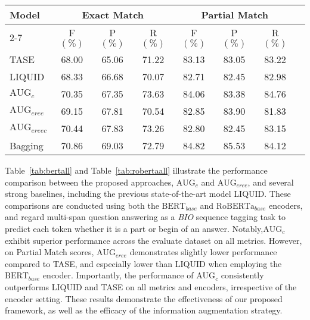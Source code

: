 \begin{table*}[width=\textwidth,cols=8,pos=h]  
	\caption{Approach performance on complete MultiSpanQA valid set based on $\text{RoBERTa}_{base}$.} 
	\label{tab:robertaall}
	\begin{tabular*}{\textwidth}{@{\extracolsep{\fill}}lccccccc}
		\toprule
		\multirow{2}{*}{\textbf{Model}} & \multicolumn{3}{c}{Exact Match} & \multicolumn{3}{c}{Partial Match}  \\
		\cline{2-7} 
		\addlinespace
		& F\((\%)\) & P\((\%)\) & R\((\%)\) & F\((\%)\) & P\((\%)\) & R\((\%)\) \\
		\midrule
		TASE & 68.00 & 65.06 & 71.22 & 83.13 & 83.05 & 83.22 \\ 
		LIQUID & 68.33 & 66.68 & 70.07 & 82.71 & 82.45 & 82.98 \\
		$\text{AUG}_{c}$ & 70.35 & 67.35 & 73.63 & 84.06 & 83.38 & 84.76 \\
		$\text{AUG}_{eree}$ & 69.15 & 67.81 & 70.54 & 82.85 & 83.90 & 81.83 \\
		$\text{AUG}_{ereec}$ & 70.44 & 67.83 & 73.26 & 82.80 & 82.45 & 83.15 \\
		Bagging & 70.86 & 69.03 & 72.79 & 84.82 & 85.53 & 84.12 \\
		\bottomrule
	\end{tabular*}      
\end{table*}
Table~\ref{tab:bertall} and Table~\ref{tab:robertaall} illustrate the performance comparison between the proposed approaches, $\text{AUG}_{c}$ and $\text{AUG}_{eree}$, and several strong baselines, including the previous state-of-the-art model LIQUID. These comparisons are conducted using both the $\text{BERT}_{base}$ and $\text{RoBERTa}_{base}$ encoders, and regard multi-span question answering as a \textit{BIO} sequence tagging task to predict each token whether it is a part or begin of an answer. 
Notably,$\text{AUG}_{c}$ exhibit superior performance across the evaluate dataset on all metrics. However, on Partial Match scores, $\text{AUG}_{eree}$ demonstrates slightly lower performance compared to TASE, and especially lower than LIQUID when employing the $\text{BERT}_{base}$ encoder.
Importantly, the performance of $\text{AUG}_{c}$ consistently outperforms LIQUID and TASE on all metrics and encoders, irrespective of the encoder setting.
These results demonstrate the effectiveness of our proposed framework, as well as the efficacy of the information augmentation strategy.

